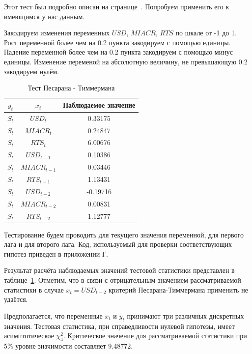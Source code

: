 \documentclass[14pt,a4paper, oneside]{extreport}
\theoremstyle{plain}              %
\theoremstyle{definition}         %
\begin{document}
Этот тест был подробно описан на странице~\pageref{P_T}. Попробуем применить его к имеющимся у нас данным.

Закодируем изменения переменных $USD$, $MIACR$, $RTS$ по шкале от -1 до 1. Рост переменной более чем на 0.2 пункта закодируем с помощью единицы. Падение переменной более чем на 0.2 пункта закодируем с помощью минус единицы. Изменение переменой на абсолютную величину, не превышающую 0.2 закодируем нулём. 

\begin{table}[h]
	\begin{center}
		\caption{Тест Песарана - Тиммермана}\label{P-Ttable}
		\begin{tabular}{|c|c|c|}
  		\hline
    	$y_t$ & $x_t$ & Наблюдаемое значение \\ \hline
  		$S_t$ & $USD_t$ & 0.33175  \\ \hline
  		$S_t$ & $MIACR_t$ & 0.24847  \\ \hline
  		$S_t$ & $RTS_t$ &  6.00676 \\ \hline
  		$S_t$ & $USD_{t-1}$ & 0.10386  \\ \hline
  		$S_t$ & $MIACR_{t-1}$ & 0.03446  \\ \hline
  		$S_t$ & $RTS_{t-1}$ & 1.13431  \\ \hline
  		$S_t$ & $USD_{t-2}$ & -0.19716  \\ \hline
  		$S_t$ & $MIACR_{t-2}$ & 0.00831  \\ \hline
  		$S_t$ & $RTS_{t-2}$ & 1.12777  \\ \hline
		\end{tabular}
	\end{center}
\end{table}

Тестирование будем проводить для текущего значения переменной, для первого лага и для второго лага. Код, используемый для проверки соответствующих гипотез приведен в приложении Г.

Результат расчёта наблюдаемых значений тестовой статистики представлен в таблице~\ref{P-Ttable}. Отметим, что в связи с отрицательным значением рассматриваемой статистики в случае $x_t = USD_{t-2}$ критерий Песарана-Тиммермана применить не удаётся. 

Предполагается, что переменные $x_t$ и $y_t$ принимают три различных дискретных значения. Тестовая статистика, при справедливости нулевой гипотезы, имеет асимптотическое $\chi^2_{4}$. Критическое значение для рассматриваемой статистики при 5\% уровне значимости составляет 9.48772. 
\end{document}
